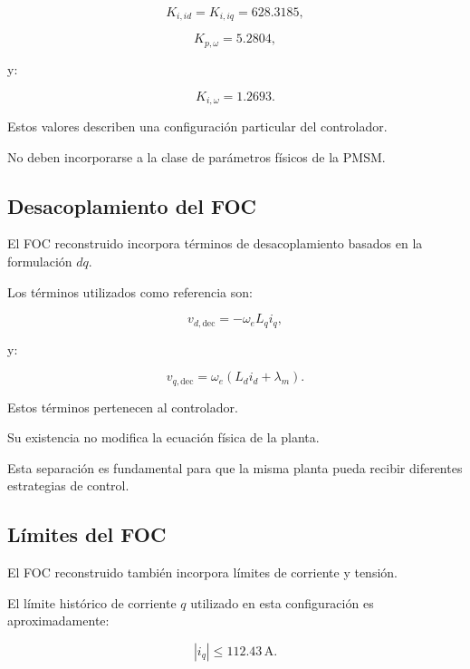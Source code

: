 \begin{equation}
K_{i,id}=K_{i,iq}=628.3185,
\end{equation}

\begin{equation}
K_{p,\omega}=5.2804,
\end{equation}

y:

\begin{equation}
K_{i,\omega}=1.2693.
\end{equation}

Estos valores describen una configuración particular del controlador.

No deben incorporarse a la clase de parámetros físicos de la PMSM.

\subsection{Desacoplamiento del FOC}

El FOC reconstruido incorpora términos de desacoplamiento basados en la formulación $dq$.

Los términos utilizados como referencia son:

\begin{equation}
v_{d,\mathrm{dec}}
=
-\omega_eL_qi_q,
\end{equation}

y:

\begin{equation}
v_{q,\mathrm{dec}}
=
\omega_e
(L_di_d+\lambda_m).
\end{equation}

Estos términos pertenecen al controlador.

Su existencia no modifica la ecuación física de la planta.

Esta separación es fundamental para que la misma planta pueda recibir diferentes estrategias de control.

\subsection{Límites del FOC}

El FOC reconstruido también incorpora límites de corriente y tensión.

El límite histórico de corriente $q$ utilizado en esta configuración es aproximadamente:

\begin{equation}
|i_q|\leq112.43\,\mathrm{A}.
\end{equation}

